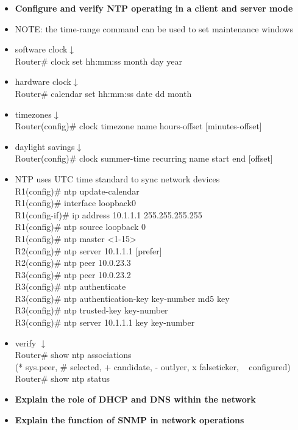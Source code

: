 \documentclass{article}
\begin{document}
\begin{itemize}
  \item \textbf{Configure and verify NTP operating in a client and server mode}
  	\item[] NOTE: the time-range command can be used to set maintenance windows\\
  	\item[] software clock$\downarrow$\\
		Router\# clock set hh:mm:ss month day year
	\item[] hardware clock$\downarrow$\\
		Router\# calendar set hh:mm:ss date dd month
	\item[] timezones$\downarrow$\\
		Router(config)\# clock timezone name hours-offset [minutes-offset]
	\item[] daylight savings$\downarrow$\\
		Router(config)\# clock summer-time recurring name start end [offset]
	\item[] NTP uses UTC time standard to sync network devices\\
		R1(config)\# ntp update-calendar\\
		R1(config)\# interface loopback0\\
		R1(config-if)\# ip address 10.1.1.1 255.255.255.255\\
		R1(config)\# ntp source loopback 0\\
		R1(config)\# ntp master \textless 1-15\textgreater\\
		R2(config)\# ntp server 10.1.1.1 [prefer]\\
		R2(config)\# ntp peer 10.0.23.3\\
		R3(config)\# ntp peer 10.0.23.2\\
		R3(config)\# ntp authenticate\\
		R3(config)\# ntp authentication-key key-number md5 key\\
		R3(config)\# ntp trusted-key key-number\\
		R3(config)\# ntp server 10.1.1.1 key key-number
	\item[] verify $\downarrow$\\
		Router\# show ntp associations\\
		(* sys.peer, \# selected, + candidate, - outlyer, x falseticker, ~ configured)\\
		Router\# show ntp status
  \item \textbf{Explain the role of DHCP and DNS within the network}
  
  \item \textbf{Explain the function of SNMP in network operations}
  

\end{itemize}
\end{document}

